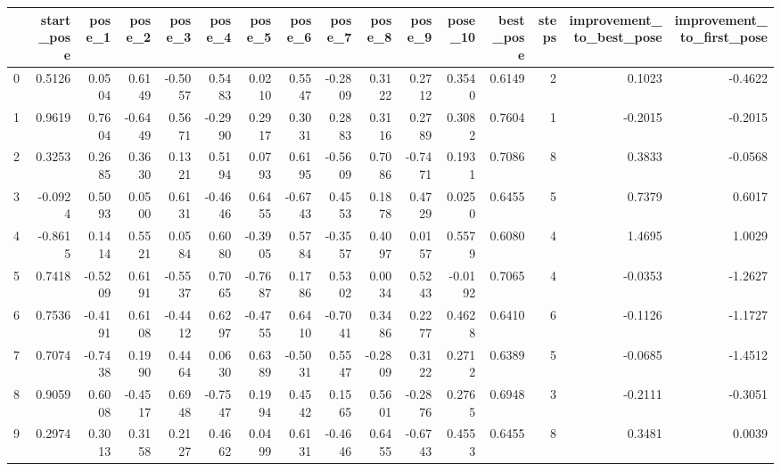 \begin{tabular}{lrrrrrrrrrrrrrrr}
\toprule
{} &  start\_pose &  pose\_1 &  pose\_2 &  pose\_3 &  pose\_4 &  pose\_5 &  pose\_6 &  pose\_7 &  pose\_8 &  pose\_9 &  pose\_10 &  best\_pose &  steps &  improvement\_to\_best\_pose &  improvement\_to\_first\_pose \\
\midrule
0 &      0.5126 &  0.0504 &  0.6149 & -0.5057 &  0.5483 &  0.0210 &  0.5547 & -0.2809 &  0.3122 &  0.2712 &   0.3540 &     0.6149 &      2 &                    0.1023 &                    -0.4622 \\
1 &      0.9619 &  0.7604 & -0.6449 &  0.5671 & -0.2990 &  0.2917 &  0.3031 &  0.2883 &  0.3116 &  0.2789 &   0.3082 &     0.7604 &      1 &                   -0.2015 &                    -0.2015 \\
2 &      0.3253 &  0.2685 &  0.3630 &  0.1321 &  0.5194 &  0.0793 &  0.6195 & -0.5609 &  0.7086 & -0.7471 &   0.1931 &     0.7086 &      8 &                    0.3833 &                    -0.0568 \\
3 &     -0.0924 &  0.5093 &  0.0500 &  0.6131 & -0.4646 &  0.6455 & -0.6743 &  0.4553 &  0.1878 &  0.4729 &   0.0250 &     0.6455 &      5 &                    0.7379 &                     0.6017 \\
4 &     -0.8615 &  0.1414 &  0.5521 &  0.0584 &  0.6080 & -0.3905 &  0.5784 & -0.3557 &  0.4097 &  0.0157 &   0.5579 &     0.6080 &      4 &                    1.4695 &                     1.0029 \\
5 &      0.7418 & -0.5209 &  0.6191 & -0.5537 &  0.7065 & -0.7687 &  0.1786 &  0.5302 &  0.0034 &  0.5243 &  -0.0192 &     0.7065 &      4 &                   -0.0353 &                    -1.2627 \\
6 &      0.7536 & -0.4191 &  0.6108 & -0.4412 &  0.6297 & -0.4755 &  0.6410 & -0.7041 &  0.3486 &  0.2277 &   0.4628 &     0.6410 &      6 &                   -0.1126 &                    -1.1727 \\
7 &      0.7074 & -0.7438 &  0.1990 &  0.4464 &  0.0630 &  0.6389 & -0.5031 &  0.5547 & -0.2809 &  0.3122 &   0.2712 &     0.6389 &      5 &                   -0.0685 &                    -1.4512 \\
8 &      0.9059 &  0.6008 & -0.4517 &  0.6948 & -0.7547 &  0.1994 &  0.4542 &  0.1565 &  0.5601 & -0.2876 &   0.2765 &     0.6948 &      3 &                   -0.2111 &                    -0.3051 \\
9 &      0.2974 &  0.3013 &  0.3158 &  0.2127 &  0.4662 &  0.0499 &  0.6131 & -0.4646 &  0.6455 & -0.6743 &   0.4553 &     0.6455 &      8 &                    0.3481 &                     0.0039 \\
\bottomrule
\end{tabular}
